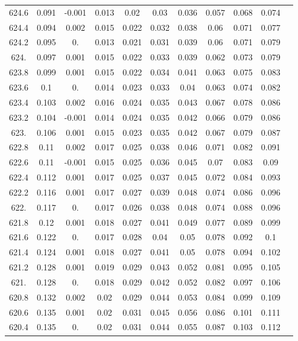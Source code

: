 \documentclass[12pt]{ctexart}
\numberwithin{equation}{section}
\begin{document}
\begin{longtable}{ccccccccccc}
624.6	&	0.091	&	-0.001	&	0.013	&	0.02	&	0.03	&	0.036	&	0.057	&	0.068	&	0.074	\\
624.4	&	0.094	&	0.002	&	0.015	&	0.022	&	0.032	&	0.038	&	0.06	&	0.071	&	0.077	\\
624.2	&	0.095	&	0.	&	0.013	&	0.021	&	0.031	&	0.039	&	0.06	&	0.071	&	0.079	\\
624.	&	0.097	&	0.001	&	0.015	&	0.022	&	0.033	&	0.039	&	0.062	&	0.073	&	0.079	\\
623.8	&	0.099	&	0.001	&	0.015	&	0.022	&	0.034	&	0.041	&	0.063	&	0.075	&	0.083	\\
623.6	&	0.1	&	0.	&	0.014	&	0.023	&	0.033	&	0.04	&	0.063	&	0.074	&	0.082	\\
623.4	&	0.103	&	0.002	&	0.016	&	0.024	&	0.035	&	0.043	&	0.067	&	0.078	&	0.086	\\
623.2	&	0.104	&	-0.001	&	0.014	&	0.024	&	0.035	&	0.042	&	0.066	&	0.079	&	0.086	\\
623.	&	0.106	&	0.001	&	0.015	&	0.023	&	0.035	&	0.042	&	0.067	&	0.079	&	0.087	\\
622.8	&	0.11	&	0.002	&	0.017	&	0.025	&	0.038	&	0.046	&	0.071	&	0.082	&	0.091	\\
622.6	&	0.11	&	-0.001	&	0.015	&	0.025	&	0.036	&	0.045	&	0.07	&	0.083	&	0.09	\\
622.4	&	0.112	&	0.001	&	0.017	&	0.025	&	0.037	&	0.045	&	0.072	&	0.084	&	0.093	\\
622.2	&	0.116	&	0.001	&	0.017	&	0.027	&	0.039	&	0.048	&	0.074	&	0.086	&	0.096	\\
622.	&	0.117	&	0.	&	0.017	&	0.026	&	0.038	&	0.048	&	0.074	&	0.088	&	0.096	\\
621.8	&	0.12	&	0.001	&	0.018	&	0.027	&	0.041	&	0.049	&	0.077	&	0.089	&	0.099	\\
621.6	&	0.122	&	0.	&	0.017	&	0.028	&	0.04	&	0.05	&	0.078	&	0.092	&	0.1	\\
621.4	&	0.124	&	0.001	&	0.018	&	0.027	&	0.041	&	0.05	&	0.078	&	0.094	&	0.102	\\
621.2	&	0.128	&	0.001	&	0.019	&	0.029	&	0.043	&	0.052	&	0.081	&	0.095	&	0.105	\\
621.	&	0.128	&	0.	&	0.018	&	0.029	&	0.042	&	0.052	&	0.082	&	0.097	&	0.106	\\
620.8	&	0.132	&	0.002	&	0.02	&	0.029	&	0.044	&	0.053	&	0.084	&	0.099	&	0.109	\\
620.6	&	0.135	&	0.001	&	0.02	&	0.031	&	0.045	&	0.056	&	0.086	&	0.101	&	0.111	\\
620.4	&	0.135	&	0.	&	0.02	&	0.031	&	0.044	&	0.055	&	0.087	&	0.103	&	0.112	\\

\end{longtable}
\end{document}
